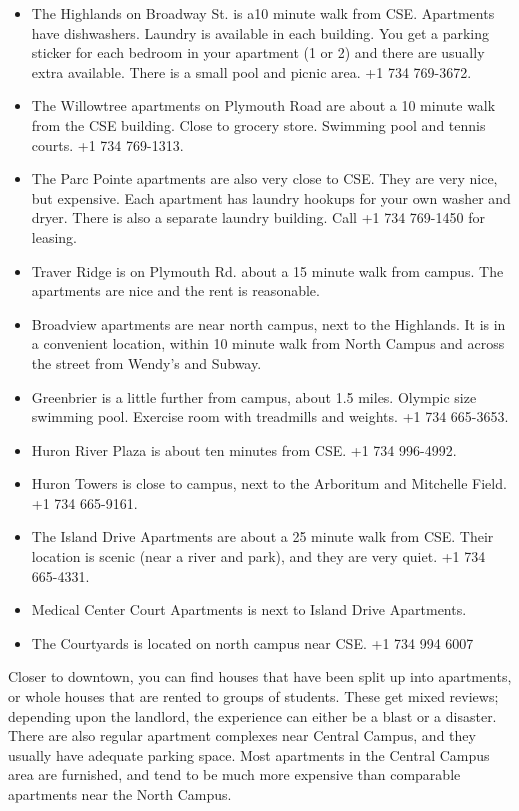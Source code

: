 \documentclass[11pt]{article}
\begin{document}
\begin{itemize}
\item The Highlands on Broadway St. is a10 minute walk from CSE.
  Apartments have dishwashers.  Laundry is available in each building.
  You get a parking sticker for each bedroom in your apartment (1
  or 2) and there are usually extra available.  There is a small pool
  and picnic area. +1 734 769-3672.
\item The Willowtree apartments on Plymouth Road are about a 10 minute
  walk from the CSE building. Close to grocery store.  Swimming pool
  and tennis courts. +1 734 769-1313.
\item The Parc Pointe apartments are also very close to CSE.  They are
  very nice, but expensive.  Each apartment has laundry hookups for
  your own washer and dryer.  There is also a separate laundry
  building.  Call +1 734 769-1450 for leasing.
\item Traver Ridge is on Plymouth Rd. about a 15 minute walk from
  campus. The apartments are nice and the rent is reasonable.
\item Broadview apartments are near north campus, next to the Highlands.
  It is in a convenient location, within 10 minute walk from North
  Campus and across the street from Wendy’s and Subway.
\item Greenbrier is a little further from campus, about 1.5 miles.
  Olympic size swimming pool.  Exercise room with treadmills and
  weights. +1 734 665-3653.
\item Huron River Plaza is about ten minutes from CSE. +1 734 996-4992.
\item Huron Towers is close to campus, next to the Arboritum and Mitchelle Field. +1 734 665-9161.
\item The Island Drive Apartments are about a 25 minute walk from CSE.
  Their location is scenic (near a river and park), and they are very
  quiet. +1 734 665-4331.
\item Medical Center Court Apartments is next to Island Drive Apartments.
\item The Courtyards is located on north campus near CSE. +1 734 994 6007
\end{itemize}

Closer to downtown, you can find houses that have been split up into
apartments, or whole houses that are rented to groups of students.
These get mixed reviews; depending upon the landlord, the experience
can either be a blast or a disaster.  There are also regular apartment
complexes near Central Campus, and they usually have adequate parking
space.  Most apartments in the Central Campus area are furnished, and
tend to be much more expensive than comparable apartments near the
North Campus.
\end{document}
